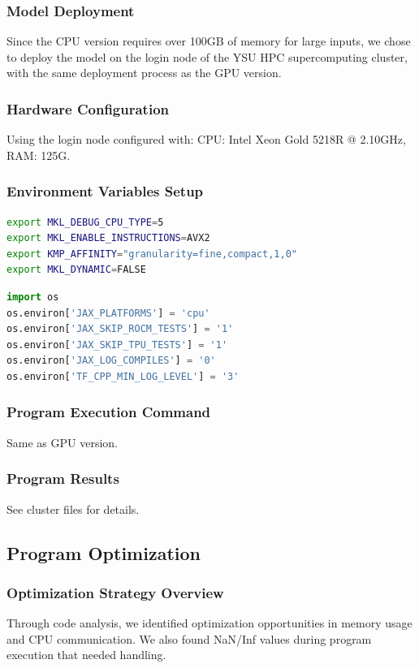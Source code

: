 \documentclass[a4paper,12pt]{article}
\begin{document}
\subsubsection{Model Deployment}
Since the CPU version requires over 100GB of memory for large inputs, we chose to deploy the model on the login node of the YSU HPC supercomputing cluster, with the same deployment process as the GPU version.

\subsubsection{Hardware Configuration}
Using the login node configured with: CPU: Intel Xeon Gold 5218R @ 2.10GHz, RAM: 125G.

\subsubsection{Environment Variables Setup}
\begin{lstlisting}[language=bash]
export MKL_DEBUG_CPU_TYPE=5
export MKL_ENABLE_INSTRUCTIONS=AVX2
export KMP_AFFINITY="granularity=fine,compact,1,0"
export MKL_DYNAMIC=FALSE
\end{lstlisting}
\begin{lstlisting}[language=python]
import os
os.environ['JAX_PLATFORMS'] = 'cpu'
os.environ['JAX_SKIP_ROCM_TESTS'] = '1'
os.environ['JAX_SKIP_TPU_TESTS'] = '1'
os.environ['JAX_LOG_COMPILES'] = '0'
os.environ['TF_CPP_MIN_LOG_LEVEL'] = '3'
\end{lstlisting}

\subsubsection{Program Execution Command}
Same as GPU version.

\subsubsection{Program Results}
See cluster files for details.

\subsection{Program Optimization}

\subsubsection{Optimization Strategy Overview}
Through code analysis, we identified optimization opportunities in memory usage and CPU communication. We also found NaN/Inf values during program execution that needed handling.
\end{document}

